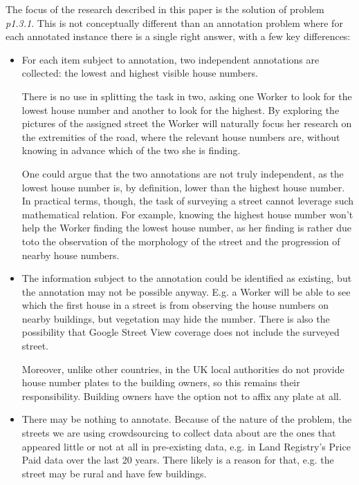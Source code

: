     The focus of the research described in this paper is the solution of problem {\it p1.3.1}. This is not conceptually different than an annotation problem where for each annotated instance there is a single right answer, with a few key differences:
    
    \begin{itemize}
        
        \item For each item subject to annotation, two independent annotations are collected: the lowest and highest visible house numbers. 
        
        There is no use in splitting the task in two, asking one Worker to look for the lowest house number and another to look for the highest. By exploring the pictures of the assigned street the Worker will naturally focus her research on the extremities of the road, where the relevant house numbers are, without knowing in advance which of the two she is finding.
        
        One could argue that the two annotations are not truly independent, as the lowest house number is, by definition, lower than the highest house number. In practical terms, though, the task of surveying a street cannot leverage such mathematical relation. For example, knowing the highest house number won't help the Worker finding the lowest house number, as her finding is rather due toto the observation of the morphology of the street and the progression of nearby house numbers. 
        
        \item The information subject to the annotation could be identified as existing, but the annotation may not be possible anyway. E.g. a Worker will be able to see which the first house in a street is from observing the house numbers on nearby buildings, but vegetation may hide the number. There is also the possibility that Google Street View coverage does not include the surveyed street.
        
        Moreover, unlike other countries, in the UK local authorities do not provide house number plates to the building owners, so this remains their responsibility. Building owners have the option not to affix any plate at all. 
        
        \item There may be nothing to annotate. Because of the nature of the problem, the streets we are using crowdsourcing to collect data about are the ones that appeared little or not at all in pre-existing data, e.g. in Land Registry's Price Paid data over the last 20 years. There likely is a reason for that, e.g. the street may be rural and have few buildings. 
        
    \end{itemize}
    
